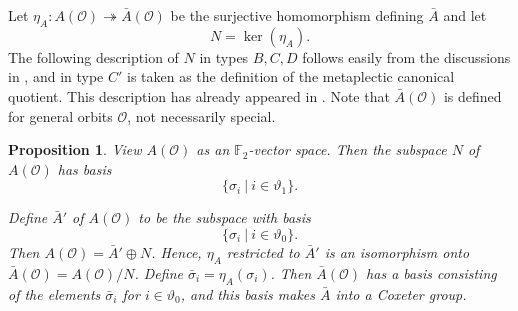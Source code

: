 \documentclass{amsart}
\newtheorem{proposition}[theorem]{Proposition}
\theoremstyle{definition}
\newcommand{\F}{\mathbb{F}}
\newcommand{\Ab}{\bar{A}}
\newcommand{\0}{\mathcal{O}}
\begin{document}


Let 
$\eta_A: A(\0)\twoheadrightarrow \Ab(\0)$ 
be the surjective homomorphism defining $\Ab$
and let
$$N = \ker(\eta_A).$$
The following description of $N$ in types $B,C,D$ follows easily from the discussions in \cite[Section 5]{Sommers:Duality}, and in type $C'$ is taken as the
definition of the metaplectic canonical quotient. This description has already appeared in \cite[Section 6.2]{JLS:Duality}. Note that $\Ab(\0)$ is defined for general orbits $\0$, not necessarily special.

\begin{proposition} \label{prop:ALT_A2Abar}
    View $A(\0)$ as an $\F_2$-vector space.
	Then the subspace $N$ of $A(\0)$ has basis     
    $$\{\sigma_i \ | \ i \in \vartheta_1\}.$$

    Define $\Ab'$ of $A(\0)$ to be the subspace with basis 
    $$\{\sigma_i \ | \ i \in \vartheta_0\}.$$
    Then $A(\0) = \Ab' \oplus N$.  Hence, 
    $\eta_A$ restricted to $\Ab'$ is an isomorphism onto $\bar{A}(\0) = A(\0)/N$. 
    Define $\bar\sigma_i= \eta_A(\sigma_i)$.
    Then $\bar{A}(\0)$ has a basis consisting of the elements $\bar\sigma_i$ for $i \in \vartheta_0$, and this basis makes $\Ab$ into a Coxeter group.
\end{proposition}
\end{document}
